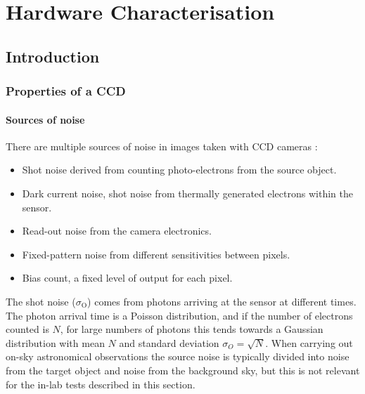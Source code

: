 \chapter{Hardware Characterisation}
\label{chap:hardware}
\chaptoc{}


\newpage
\section{Introduction}
\label{sec:hardware_intro}
\begin{colsection}


\begin{colsection}


\end{colsection}

\subsection{Properties of a CCD}
\label{sec:CCDs}
\begin{colsection}

\subsubsection{Sources of noise}

There are multiple sources of noise in images taken with CCD cameras \citep{CCDs}:

\begin{itemize}
    \item Shot noise derived from counting photo-electrons from the source object.
    \item Dark current noise, shot noise from thermally generated electrons within the sensor.
    \item Read-out noise from the camera electronics.
    \item Fixed-pattern noise from different sensitivities between pixels.
    \item Bias count, a fixed level of output for each pixel.
\end{itemize}

The shot noise ($\sigma_\text{O}$) comes from photons arriving at the sensor at different times. The photon arrival time is a Poisson distribution, and if the number of electrons counted is $N$, for large numbers of photons this tends towards a Gaussian distribution with mean $N$ and standard deviation $\sigma_O = \sqrt{N}$. When carrying out on-sky astronomical observations the source noise is typically divided into noise from the target object and noise from the background sky, but this is not relevant for the in-lab tests described in this section.


\end{colsection}
\end{colsection}
